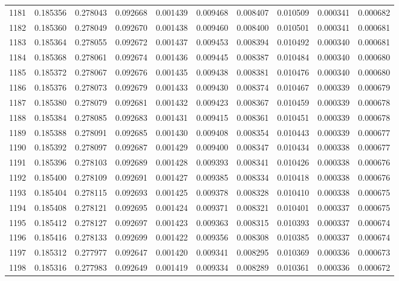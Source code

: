 \begin{tabular}{lrrrrrrrrr}
1181 & 0.185356 & 0.278043 & 0.092668 & 0.001439 & 0.009468 & 0.008407 & 0.010509 & 0.000341 & 0.000682 \\
1182 & 0.185360 & 0.278049 & 0.092670 & 0.001438 & 0.009460 & 0.008400 & 0.010501 & 0.000341 & 0.000681 \\
1183 & 0.185364 & 0.278055 & 0.092672 & 0.001437 & 0.009453 & 0.008394 & 0.010492 & 0.000340 & 0.000681 \\
1184 & 0.185368 & 0.278061 & 0.092674 & 0.001436 & 0.009445 & 0.008387 & 0.010484 & 0.000340 & 0.000680 \\
1185 & 0.185372 & 0.278067 & 0.092676 & 0.001435 & 0.009438 & 0.008381 & 0.010476 & 0.000340 & 0.000680 \\
1186 & 0.185376 & 0.278073 & 0.092679 & 0.001433 & 0.009430 & 0.008374 & 0.010467 & 0.000339 & 0.000679 \\
1187 & 0.185380 & 0.278079 & 0.092681 & 0.001432 & 0.009423 & 0.008367 & 0.010459 & 0.000339 & 0.000678 \\
1188 & 0.185384 & 0.278085 & 0.092683 & 0.001431 & 0.009415 & 0.008361 & 0.010451 & 0.000339 & 0.000678 \\
1189 & 0.185388 & 0.278091 & 0.092685 & 0.001430 & 0.009408 & 0.008354 & 0.010443 & 0.000339 & 0.000677 \\
1190 & 0.185392 & 0.278097 & 0.092687 & 0.001429 & 0.009400 & 0.008347 & 0.010434 & 0.000338 & 0.000677 \\
1191 & 0.185396 & 0.278103 & 0.092689 & 0.001428 & 0.009393 & 0.008341 & 0.010426 & 0.000338 & 0.000676 \\
1192 & 0.185400 & 0.278109 & 0.092691 & 0.001427 & 0.009385 & 0.008334 & 0.010418 & 0.000338 & 0.000676 \\
1193 & 0.185404 & 0.278115 & 0.092693 & 0.001425 & 0.009378 & 0.008328 & 0.010410 & 0.000338 & 0.000675 \\
1194 & 0.185408 & 0.278121 & 0.092695 & 0.001424 & 0.009371 & 0.008321 & 0.010401 & 0.000337 & 0.000675 \\
1195 & 0.185412 & 0.278127 & 0.092697 & 0.001423 & 0.009363 & 0.008315 & 0.010393 & 0.000337 & 0.000674 \\
1196 & 0.185416 & 0.278133 & 0.092699 & 0.001422 & 0.009356 & 0.008308 & 0.010385 & 0.000337 & 0.000674 \\
1197 & 0.185312 & 0.277977 & 0.092647 & 0.001420 & 0.009341 & 0.008295 & 0.010369 & 0.000336 & 0.000673 \\
1198 & 0.185316 & 0.277983 & 0.092649 & 0.001419 & 0.009334 & 0.008289 & 0.010361 & 0.000336 & 0.000672 \\

\end{tabular}
